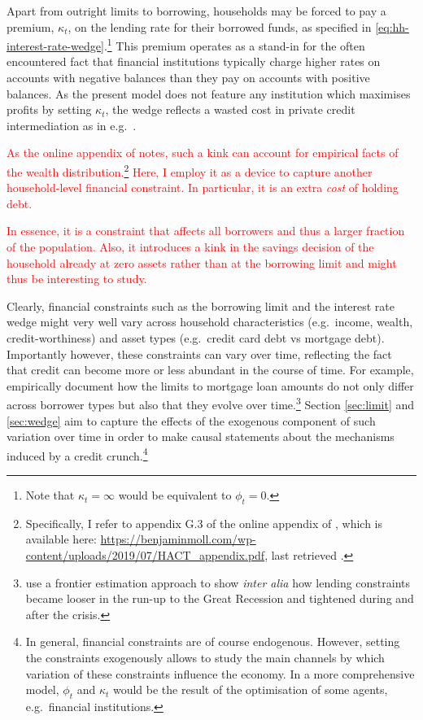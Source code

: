 \documentclass[a4paper,12pt]{article} %
\numberwithin{equation}{section} %
\numberwithin{figure}{section}
\numberwithin{table}{section}
\begin{document}
Apart from outright limits to borrowing, households may be forced to pay a premium, $\kappa_t$, on the lending rate for their borrowed funds, as specified in \eqref{eq:hh-interest-rate-wedge}.\footnote{Note that $\kappa_t = \infty$ would be equivalent to $\phi_t=0$.} This premium operates as a stand-in for the often encountered fact that financial institutions typically charge higher rates on accounts with negative balances than they pay on accounts with positive balances. As the present model does not feature any institution which maximises profits by setting $\kappa_t$, the wedge reflects a wasted cost in private credit intermediation as in e.g.~\textcite{bayer2023}.

\textcolor{red}{As the online appendix of \textcite{achdou2022} notes, such a kink can account for empirical facts of the wealth distribution.\footnote{Specifically, I refer to appendix G.3 of the online appendix of \textcite{achdou2022}, which is available here: \url{https://benjaminmoll.com/wp-content/uploads/2019/07/HACT_appendix.pdf}, last retrieved .} Here, I employ it as a device to capture another household-level financial constraint. In particular, it is an extra \textit{cost} of holding debt.}

\textcolor{red}{In essence, it is a constraint that affects all borrowers and thus a larger fraction of the population. Also, it introduces a kink in the savings decision of the household already at zero assets rather than at the borrowing limit and might thus be interesting to study.}


Clearly, financial constraints such as the borrowing limit and the interest rate wedge might very well vary across household characteristics (e.g.~income, wealth, credit-worthiness) and asset types (e.g.~credit card debt vs mortgage debt). Importantly however, these constraints can vary over time, reflecting the fact that credit can become more or less abundant in the course of time. For example, \textcite{anenberg2018} empirically document how the limits to mortgage loan amounts do not only differ across borrower types but also that they evolve over time.\footnote{\textcite{anenberg2018} use a frontier estimation approach to show \textit{inter alia} how lending constraints became looser in the run-up to the Great Recession and tightened during and after the crisis.} Section \ref{sec:limit} and \ref{sec:wedge} aim to capture the effects of the exogenous component of such variation over time in order to make causal statements about the mechanisms induced by a credit crunch.\footnote{In general, financial constraints are of course endogenous. However, setting the constraints exogenously allows to study the main channels by which variation of these constraints influence the economy. In a more comprehensive model, $\phi_t$ and $\kappa_t$ would be the result of the optimisation of some agents, e.g.~financial institutions.}
\end{document}
